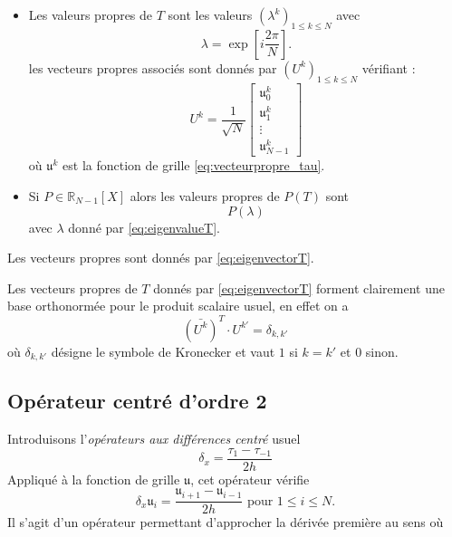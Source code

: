 \begin{proposition}
\begin{itemize}
\item Les valeurs propres de $T$ sont les valeurs $(\lambda^k)_{1 \leq k \leq N}$ avec 
\begin{equation}
\lambda = \exp \left[ i \dfrac{2 \pi}{N} \right].
\label{eq:eigenvalueT}
\end{equation}
les vecteurs propres associés sont donnés par $\left( U^k \right)_{1 \leq k \leq N}$ vérifiant :
\begin{equation}
U^k = \dfrac{1}{\sqrt{N}} \begin{bmatrix}
\mathfrak{u}_0^k\\
\mathfrak{u}_1^k\\
\vdots \\
\mathfrak{u}_{N-1}^k
\end{bmatrix}
\label{eq:eigenvectorT}
\end{equation}
où $\mathfrak{u}^k$ est la fonction de grille \eqref{eq:vecteurpropre_tau}.

\item Si $P \in \mathbb{R}_{N-1}[X]$ alors les valeurs propres de $P(T)$ sont 
\begin{equation}
P(\lambda)
\end{equation}
avec $\lambda$ donné par \eqref{eq:eigenvalueT}.
\end{itemize}
Les vecteurs propres sont donnés par \eqref{eq:eigenvectorT}.
\label{prop:eigen_P(tau)}
\end{proposition}

Les vecteurs propres de $T$ donnés par \eqref{eq:eigenvectorT} forment clairement une base orthonormée pour le produit scalaire usuel, en effet on a 
\begin{equation}
(\bar{U^k})^T \cdot U^{k'} = \delta_{k,k'}
\end{equation}
où $\delta_{k,k'}$ désigne le symbole de Kronecker et vaut $1$ si $k=k'$ et $0$ sinon.













\subsection{Opérateur centré d'ordre 2}

Introduisons l'\textit{opérateurs aux différences centré} usuel
\begin{equation}
\delta_x = \dfrac{\tau_1 - \tau_{-1}}{2h}
\end{equation}
Appliqué à la fonction de grille $\mathfrak{u}$, cet opérateur vérifie 
\begin{equation}
\delta_x \mathfrak{u}_i = \dfrac{\mathfrak{u}_{i+1} - \mathfrak{u}_{i-1}}{2h} \text{ pour } 1 \leq i \leq N.
\end{equation}
Il s'agit d'un opérateur permettant d'approcher la dérivée première au sens où

